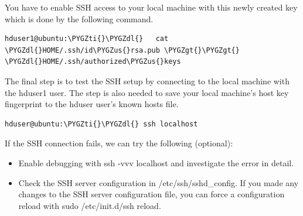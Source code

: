 \documentclass[letterpaper,10pt,english]{sphinxmanual}
\def\PYGZus{\char`\_}
\def\PYGZgt{\char`\>}
\def\PYGZdl{\char`\$}
\def\PYGZti{\char`\~}
\begin{document}
You have to enable SSH access to your local machine with this newly created key which is done by the following command.

\begin{Verbatim}[commandchars=\\\{\}]
hduser1@ubuntu:\PYGZti{}\PYGZdl{}   cat \PYGZdl{}HOME/.ssh/id\PYGZus{}rsa.pub \PYGZgt{}\PYGZgt{} \PYGZdl{}HOME/.ssh/authorized\PYGZus{}keys
\end{Verbatim}

The final step is to test the SSH setup by connecting to the local machine with the hduser1 user.
The step is also needed to save your local machine’s host key fingerprint to the hduser user’s known hosts file.

\begin{Verbatim}[commandchars=\\\{\}]
hduser@ubuntu:\PYGZti{}\PYGZdl{} ssh localhost
\end{Verbatim}
\begin{figure}[htbp]
\centering

\end{figure}

If the SSH connection fails, we can try the following (optional):
\begin{itemize}
\item {} 
Enable debugging with ssh -vvv localhost and investigate the error in detail.

\item {} 
Check the SSH server configuration in /etc/ssh/sshd\_config.  If you made any changes to the SSH server configuration file, you can force a configuration reload with sudo /etc/init.d/ssh reload.

\end{itemize}
\end{document}
